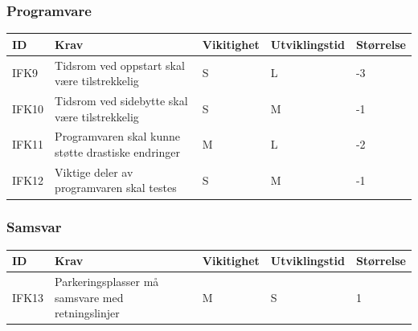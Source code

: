 \documentclass[12pt]{article}
\newcommand{\cellr}{\cellcolor{red!25}}
\newcommand{\cello}{\cellcolor{orange!25}}
\newcommand{\celll}{\cellcolor{lime!25}}
\begin{document}
        \subsubsection{Programvare}

        \begin{tabular}{|p{2cm}|p{6cm}|
            >{\centering\arraybackslash}p{2cm}|
            >{\centering\arraybackslash}p{2cm}|
            >{\centering\arraybackslash}p{2cm}|}
            \hline
            \bf ID & \bf Krav & \bf Vikitighet & \bf Utviklingstid & \bf Størrelse\\
            \hline
            IFK9
            &
            Tidsrom ved oppstart skal være tilstrekkelig
            & S & L & \cellr -3\\
            \hline
            IFK10
            &
            Tidsrom ved sidebytte skal være tilstrekkelig
            & S & M & \cello -1\\
            \hline
            IFK11
            &
            Programvaren skal kunne støtte drastiske endringer
            & M & L & \cello -2\\
            \hline
            IFK12
            &
            Viktige deler av programvaren skal testes
            & S & M & \cello -1\\
            \hline
        \end{tabular}

        \subsubsection{Samsvar}
        
        \begin{tabular}{|p{2cm}|p{6cm}|
            >{\centering\arraybackslash}p{2cm}|
            >{\centering\arraybackslash}p{2cm}|
            >{\centering\arraybackslash}p{2cm}|}
            \hline
            \bf ID & \bf Krav & \bf Vikitighet & \bf Utviklingstid & \bf Størrelse\\
            \hline
            IFK13
            &
            Parkeringsplasser må samsvare med retningslinjer
            & M & S & \celll 1\\
            \hline
        \end{tabular}
\end{document}

